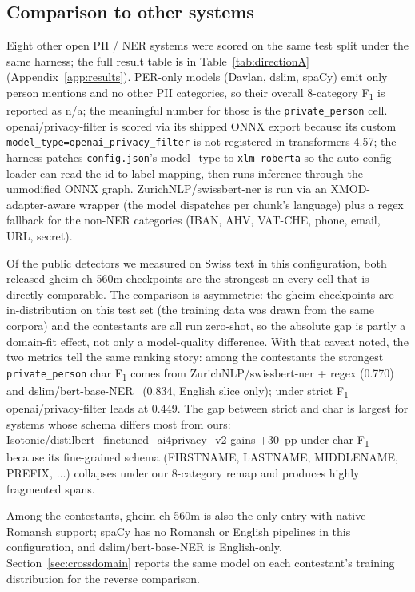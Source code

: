 \documentclass[sigconf,nonacm]{acmart}
\begin{document}
\subsection{Comparison to other systems}

Eight other open PII / NER systems were scored on the same test split
under the same harness; the full result table is in
Table~\ref{tab:directionA} (Appendix~\ref{app:results}).
PER-only models (Davlan, dslim, spaCy) emit only person mentions and
no other PII categories, so their overall 8-category
F\textsubscript{1} is reported as n/a; the meaningful number for
those is the \texttt{private\_person} cell.
\textsf{openai/privacy-filter} is scored via its shipped ONNX export
because its custom \texttt{model\_type=openai\_privacy\_filter} is
not registered in \textsf{transformers} 4.57; the harness patches
\texttt{config.json}'s model\_type to \texttt{xlm-roberta} so the
auto-config loader can read the id-to-label mapping, then runs
inference through the unmodified ONNX graph.
\textsf{ZurichNLP/swissbert-ner} is run via an XMOD-adapter-aware
wrapper (the model dispatches per chunk's language) plus a regex
fallback for the non-NER categories (IBAN, AHV, VAT-CHE, phone,
email, URL, secret).

Of the public detectors we measured on Swiss text in this
configuration, both released \textsf{gheim-ch-560m} checkpoints are
the strongest on every cell that is directly comparable. The
comparison is asymmetric: the \textsf{gheim} checkpoints are
in-distribution on this test set (the training data was drawn from
the same corpora) and the contestants are all run zero-shot, so the
absolute gap is partly a domain-fit effect, not only a model-quality
difference. With that caveat noted, the two metrics tell the same
ranking story: among the contestants the strongest
\texttt{private\_person} char F\textsubscript{1} comes from
\textsf{ZurichNLP/swissbert-ner} + regex (0.770) and
\textsf{dslim/bert-base-NER}~\cite{dslim2020bertbasener}
(0.834, English slice only); under
strict F\textsubscript{1} \textsf{openai/privacy-filter} leads at
0.449. The gap between strict and char is largest for systems whose
schema differs most from ours:
\textsf{Isotonic/distilbert\_finetuned\_ai4privacy\_v2} gains
$+30$~pp under char F\textsubscript{1} because its fine-grained
schema (FIRSTNAME, LASTNAME, MIDDLENAME, PREFIX, $\ldots$) collapses
under our 8-category remap and produces highly fragmented spans.

Among the contestants, \textsf{gheim-ch-560m} is also the only entry
with native Romansh support; spaCy has no Romansh or English
pipelines in this configuration, and \textsf{dslim/bert-base-NER} is
English-only. Section~\ref{sec:crossdomain} reports the same model
on each contestant's training distribution for the reverse
comparison.
\end{document}
